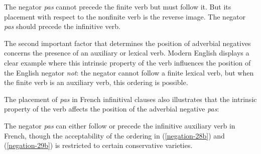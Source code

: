 \documentclass[output=paper
                ,modfonts
                ,nonflat
	        ,collection
	        ,collectionchapter
	        ,collectiontoclongg
 	        ,biblatex
                ,babelshorthands
                ,newtxmath
                ,draftmode
                ,colorlinks, citecolor=brown
]{./langsci/langscibook}
\begin{document}
{\begin{exe}
\begin{xlist}
\begin{exe}
\begin{xlist}
\eal{}
\zl

\noindent
The negator \textit{pas} cannot precede the finite verb
but must follow it. But its placement with respect to
the nonfinite verb is the reverse image. The negator \textit{pas}
should precede the infinitive verb.

The second important factor that determines the position of adverbial
negatives concerns the presence of an auxiliary or lexical  verb.
Modern English displays a clear example where this
intrinsic property of the verb influences the position of
the English negator \textit{not}: the negator cannot follow
a finite lexical  verb, but when the finite verb is an auxiliary verb,
this ordering is possible.

\eal
{}
\zl

\noindent
The placement of \textit{pas} in French infinitival
clauses also illustrates that the intrinsic property of
the verb affects the position of the adverbial negative \textit{pas}:

\eal
{}
 \label{negation-28b}
\zl

\eal
{}
 \label{negation-29b}
\zl

\noindent
The negator \textit{pas} can either follow or precede the infinitive
auxiliary verb in French, though the acceptability of the
ordering in (\ref{negation-28b}) and (\ref{negation-29b}) is restricted to certain conservative
varieties.


\end{xlist}
\end{exe}
\end{xlist}
\end{exe}}
\end{document}
